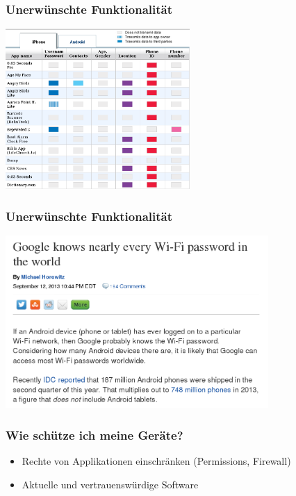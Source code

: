 \documentclass[12pt, xcolor={svgnames,table}]{beamer}
\begin{document}
\begin{frame}
  \frametitle{Unerwünschte Funktionalität}
  \begin{center}
    \includegraphics[width=7cm]{img/backdoor-apps}
  \par\end{center}
\end{frame}

\begin{frame}
  \frametitle{Unerwünschte Funktionalität}
  \begin{center}
    \includegraphics[width=10cm]{img/backdoor-android}
  \par\end{center}
\end{frame}

\begin{frame}
    \frametitle{Wie schütze ich meine Geräte?}
    \begin{itemize}
      \item Rechte von Applikationen einschränken (Permissions, Firewall)
      \item Aktuelle und vertrauenswürdige Software
    \end{itemize}
\end{frame}
\end{document}
